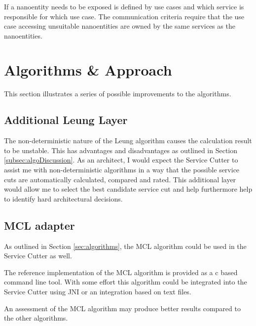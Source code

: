 If a nanoentity needs to be exposed is defined by use cases and which service is responsible for which use case. The communication criteria require that the use case accessing unsuitable nanoentities are owned by the same services as the nanoentities.


\section{Algorithms \& Approach}

This section illustrates a series of possible improvements to the algorithms.

\subsection{Additional Leung Layer}

The non-deterministic nature of the Leung algorithm causes the calculation result to be unstable. This has advantages and disadvantages as outlined in Section \ref{subsec:algoDiscussion}. As an architect, I would expect the Service Cutter to assist me with non-deterministic algorithms in a way that the possible service cuts are automatically calculated, compared and rated. This additional layer would allow me to select the best candidate service cut and help furthermore help to identify hard architectural decisions.

\subsection{MCL adapter}
\label{subsec:mclAdapter}

As outlined in Section \ref{sec:algorithms}, the MCL algorithm could be used in the Service Cutter as well.

The reference implementation of the MCL algorithm is provided as a \gls{c} based command line tool. With some effort this algorithm could be integrated into the Service Cutter using \gls{JNI} or an integration based on text files.

An assessment of the MCL algorithm may produce better results compared to the other algorithms.

